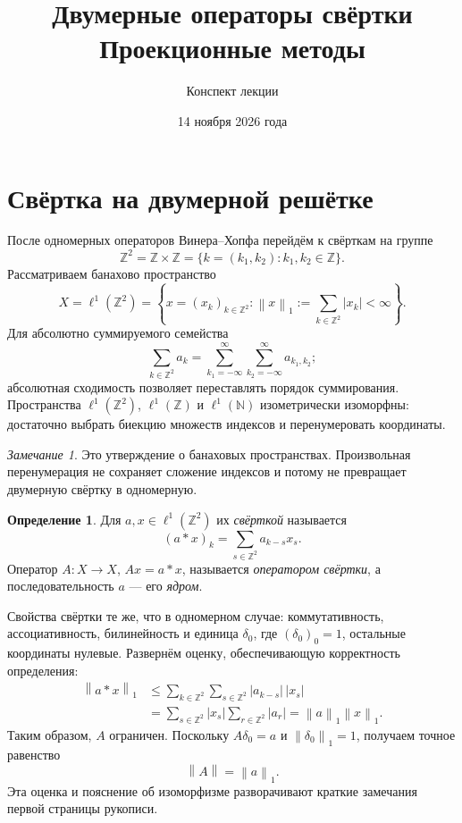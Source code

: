 \documentclass[12pt,a4paper]{article}
\title{Двумерные операторы свёртки\\Проекционные методы}
\author{Конспект лекции}
\date{14 ноября 2026 года}
\theoremstyle{definition}
\newtheorem{definition}{Определение}
\theoremstyle{remark}
\newtheorem*{remark}{Замечание}
\newcommand{\ZZ}{\mathbb{Z}}
\newcommand{\norm}[1]{\left\lVert #1\right\rVert}
\begin{document}
\maketitle

\section{Свёртка на двумерной решётке}

После одномерных операторов Винера--Хопфа перейдём к свёрткам
на группе
\[
  \ZZ^2=\ZZ\times\ZZ=\{k=(k_1,k_2):k_1,k_2\in\ZZ\}.
\]
Рассматриваем банахово пространство
\[
  X=\ell^1(\ZZ^2)
  =\left\{x=(x_k)_{k\in\ZZ^2}:\norm{x}_1
    :=\sum_{k\in\ZZ^2}|x_k|<\infty\right\}.
\]
Для абсолютно суммируемого семейства
\[
  \sum_{k\in\ZZ^2}a_k
  =\sum_{k_1=-\infty}^{\infty}\sum_{k_2=-\infty}^{\infty}a_{k_1,k_2};
\]
абсолютная сходимость позволяет переставлять порядок суммирования.
Пространства $\ell^1(\ZZ^2)$, $\ell^1(\ZZ)$ и $\ell^1(\mathbb N)$
изометрически изоморфны: достаточно выбрать биекцию множеств
индексов и перенумеровать координаты.

\begin{remark}
Это утверждение о банаховых пространствах. Произвольная
перенумерация не сохраняет сложение индексов и потому не превращает
двумерную свёртку в одномерную.
\end{remark}

\begin{definition}
Для $a,x\in\ell^1(\ZZ^2)$ их \emph{свёрткой} называется
\[
  (a*x)_k=\sum_{s\in\ZZ^2}a_{k-s}x_s.
\]
Оператор $A:X\to X$, $Ax=a*x$, называется \emph{оператором свёртки},
а последовательность $a$ --- его \emph{ядром}.
\end{definition}

Свойства свёртки те же, что в одномерном случае:
коммутативность, ассоциативность, билинейность и единица
$\delta_0$, где $(\delta_0)_0=1$, остальные координаты нулевые.
Развернём оценку, обеспечивающую корректность определения:
\begin{align*}
  \norm{a*x}_1
  &\leqslant\sum_{k\in\ZZ^2}\sum_{s\in\ZZ^2}|a_{k-s}|\,|x_s|\\
  &=\sum_{s\in\ZZ^2}|x_s|\sum_{r\in\ZZ^2}|a_r|
   =\norm{a}_1\norm{x}_1.
\end{align*}
Таким образом, $A$ ограничен. Поскольку $A\delta_0=a$ и
$\norm{\delta_0}_1=1$, получаем точное равенство
\[
  \boxed{\norm{A}=\norm{a}_1}.
\]
Эта оценка и пояснение об изоморфизме разворачивают краткие
замечания первой страницы рукописи.
\end{document}
